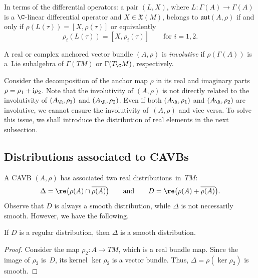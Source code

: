 In terms of the differential operators: a pair $(L,X)$, where $L\colon \Gamma(A)\to \Gamma(A)$ is a $\C$-linear differential operator and $X\in \mathfrak{X}(M)$, belongs to $\mathfrak{aut}(A,\rho)$ if and only if $\rho(L(\tau))=[X,\rho(\tau)]$
or equivalently
\begin{equation*}%
\rho_i(L(\tau))=[X, \rho_i(\tau)]\qquad\text{for $i=1,2$}.
\end{equation*}
\begin{Definition}
A real or complex anchored vector bundle $(A,\rho)$ is {\em involutive} if $\rho(\Gamma(A))$ is a~Lie subalgebra of $\Gamma(TM)$ or $\Gamma(T_{\C}M)$, respectively.
\end{Definition}

Consider the decomposition of the anchor map $\rho$ in its real and imaginary parts ${\rho=\rho_1+{\rm i}\rho_2}$. Note that the involutivity of $(A,\rho)$ is not directly related to the involutivity of $(A_{\R}, \rho_1)$ and $(A_{\R}, \rho_2)$. Even if both $(A_{\R}, \rho_1)$ and $(A_{\R}, \rho_2)$ are involutive, we cannot ensure the involutivity of~$(A,\rho)$ and vice versa. To solve this issue, we shall introduce the distribution of real elements in the next subsection.

\subsection{Distributions associated to CAVBs}
A CAVB $(A,\rho)$ has associated two real distributions~in~$TM$:
 \[\Delta=\re \bigl(\rho(A)\cap \overline{\rho(A)}\bigr)\qquad\text{and} \qquad D=\re \bigl(\rho(A) + \overline{\rho(A)}\bigr).\]
Observe that $D$ is always a smooth distribution, while $\Delta$ is not necessarily smooth. However, we have the following.

 \begin{Lemma}\label{imageanchor}
 If $D$ is a regular distribution, then $\Delta$ is a smooth distribution.
 \end{Lemma}
\begin{proof}
 Consider the map $\rho_2\colon A\to TM$, which is a real bundle map. Since the image of $\rho_2$ is~$D$, its kernel $\ker \rho_2$ is a vector bundle. Thus, $\Delta=\rho(\ker \rho_2)$ is smooth.
\end{proof}


